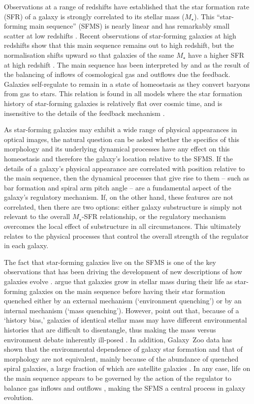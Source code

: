 \documentclass[useAMS,usenatbib]{mn2e}
\begin{document}
Observations at a range of redshifts have established that the star formation rate (SFR) of a galaxy is strongly correlated to its stellar mass ($M_\star$). This ``star-forming main sequence'' (SFMS) is nearly linear and has remarkably small scatter at low redshifts \citep{bri04,sal07}. Recent observations of star-forming galaxies at high redshifts show that this main sequence remains out to high redshift, but the normalisation shifts upward so that galaxies of the same $M_\star$ have a higher SFR at high redshift \citep{noe07,dad07}. The main sequence has been interpreted by \citet{bou10} and \citet{lil13} as the result of the balancing of inflows of cosmological gas and outflows due the feedback. Galaxies self-regulate to remain in a state of homeostasis as they convert baryons from gas to stars. This relation is found in all models where the star formation history of star-forming galaxies is relatively flat over cosmic time, and is insensitive to the details of the feedback mechanism \citep{hop14}. 

As star-forming galaxies may exhibit a wide range of physical appearances in optical images, the natural question can be asked whether the specifics of this morphology and its underlying dynamical processes have any effect on this homeostasis and therefore the galaxy's location relative to the SFMS. If the details of a galaxy's physical appearance are correlated with position relative to the main sequence, then the dynamical processes that give rise to them -- such as bar formation and spiral arm pitch angle -- are a fundamental aspect of the galaxy's regulatory mechanism. If, on the other hand, these features are not correlated, then there are two options: either galaxy substructure is simply not relevant to the overall $M_\star$-SFR relationship, or the regulatory mechanism overcomes the local effect of substructure in all circumstances. This ultimately relates to the physical processes that control the overall strength of the regulator in each galaxy.

The fact that star-forming galaxies live on the SFMS is one of the key observations that has been driving the development of new descriptions of how galaxies evolve \citep[eg, ][]{sch07b}. \citet{pen10a,pen12} argue that galaxies grow in stellar mass during their life as star-forming galaxies on the main sequence before having their star formation quenched either by an external mechanism (`environment quenching') or by an internal mechanism (`mass quenching').  However, \citet{del12} point out that, because of a `history bias,' galaxies of identical stellar mass may have different environmental histories that are difficult to disentangle, thus making the mass versus environment debate inherently ill-posed \citep[see also][]{van08b}. In addition, Galaxy~Zoo data has shown that the environmental dependence of galaxy star formation and that of morphology are not equivalent, mainly because of the abundance of quenched spiral galaxies, a large fraction of which are satellite galaxies \citep{ski09,bam09}. In any case, life on the main sequence appears to be governed by the action of the regulator to balance gas inflows and outflows \citep{lil13}, making the SFMS a central process in galaxy evolution.
\end{document}
